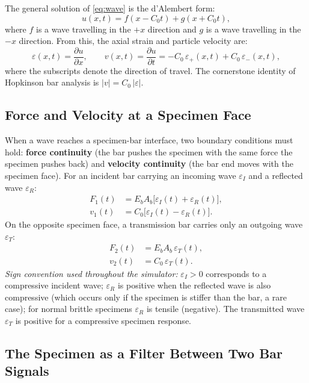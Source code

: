 \documentclass[11pt,a4paper]{article}
\newcommand{\eps}{\varepsilon}
\newcommand{\Cz}{C_0}
\newcommand{\Ab}{A_b}
\begin{document}
The general solution of \eqref{eq:wave} is the d'Alembert form:
\begin{equation}
  u(x,t) = f(x - \Cz t) + g(x + \Cz t),
\end{equation}
where $f$ is a wave travelling in the $+x$ direction and $g$ is a wave travelling
in the $-x$ direction. From this, the axial strain and particle velocity are:
\begin{equation}
  \eps(x,t) = \frac{\partial u}{\partial x},
  \qquad
  v(x,t) = \frac{\partial u}{\partial t} = -\Cz\,\eps_+(x,t) + \Cz\,\eps_-(x,t),
\end{equation}
where the subscripts denote the direction of travel. The cornerstone identity of
Hopkinson bar analysis is $|v| = \Cz\,|\eps|$.

\subsection{Force and Velocity at a Specimen Face}

When a wave reaches a specimen-bar interface, two boundary conditions must hold:
\textbf{force continuity} (the bar pushes the specimen with the same force the
specimen pushes back) and \textbf{velocity continuity} (the bar end moves with the
specimen face). For an incident bar carrying an incoming wave $\eps_I$ and a
reflected wave $\eps_R$:
\begin{align}
  F_1(t) &= E_b \Ab \big[\eps_I(t) + \eps_R(t)\big],
  \label{eq:F1}\\
  v_1(t) &= \Cz \big[\eps_I(t) - \eps_R(t)\big].
  \label{eq:v1}
\end{align}
On the opposite specimen face, a transmission bar carries only an outgoing wave
$\eps_T$:
\begin{align}
  F_2(t) &= E_b \Ab\, \eps_T(t),
  \label{eq:F2}\\
  v_2(t) &= \Cz\, \eps_T(t).
  \label{eq:v2}
\end{align}
\textit{Sign convention used throughout the simulator:} $\eps_I > 0$ corresponds
to a compressive incident wave; $\eps_R$ is positive when the reflected wave is
also compressive (which occurs only if the specimen is stiffer than the bar, a
rare case); for normal brittle specimens $\eps_R$ is tensile (negative). The
transmitted wave $\eps_T$ is positive for a compressive specimen response.

\subsection{The Specimen as a Filter Between Two Bar Signals}
\end{document}
